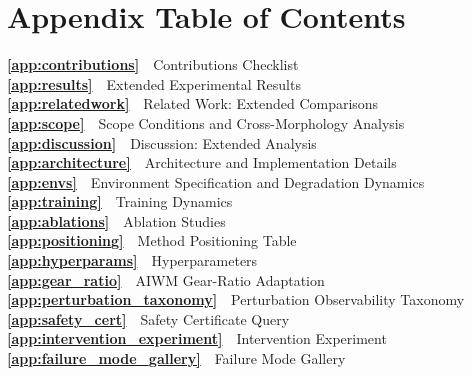 \documentclass{article}
\begin{document}
{\section*{Appendix Table of Contents}
\vspace{4pt}
{\small
\noindent\textbf{\ref{app:contributions}}~~Contributions Checklist\dotfill\pageref{app:contributions}\\
\noindent\textbf{\ref{app:results}}~~Extended Experimental Results\dotfill\pageref{app:results}\\
\noindent\textbf{\ref{app:relatedwork}}~~Related Work: Extended Comparisons\dotfill\pageref{app:relatedwork}\\
\noindent\textbf{\ref{app:scope}}~~Scope Conditions and Cross-Morphology Analysis\dotfill\pageref{app:scope}\\
\noindent\textbf{\ref{app:discussion}}~~Discussion: Extended Analysis\dotfill\pageref{app:discussion}\\
\noindent\textbf{\ref{app:architecture}}~~Architecture and Implementation Details\dotfill\pageref{app:architecture}\\
\noindent\textbf{\ref{app:envs}}~~Environment Specification and Degradation Dynamics\dotfill\pageref{app:envs}\\
\noindent\textbf{\ref{app:training}}~~Training Dynamics\dotfill\pageref{app:training}\\
\noindent\textbf{\ref{app:ablations}}~~Ablation Studies\dotfill\pageref{app:ablations}\\
\noindent\textbf{\ref{app:positioning}}~~Method Positioning Table\dotfill\pageref{app:positioning}\\
\noindent\textbf{\ref{app:hyperparams}}~~Hyperparameters\dotfill\pageref{app:hyperparams}\\
\noindent\textbf{\ref{app:gear_ratio}}~~AIWM Gear-Ratio Adaptation\dotfill\pageref{app:gear_ratio}\\
\noindent\textbf{\ref{app:perturbation_taxonomy}}~~Perturbation Observability Taxonomy\dotfill\pageref{app:perturbation_taxonomy}\\
\noindent\textbf{\ref{app:safety_cert}}~~Safety Certificate Query\dotfill\pageref{app:safety_cert}\\
\noindent\textbf{\ref{app:intervention_experiment}}~~Intervention Experiment\dotfill\pageref{app:intervention_experiment}\\
\noindent\textbf{\ref{app:failure_mode_gallery}}~~Failure Mode Gallery\dotfill\pageref{app:failure_mode_gallery}\\
}}
\end{document}
